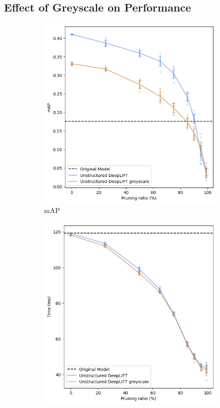 \documentclass[10pt]{cai}
\begin{document}
\subsection{Effect of Greyscale on Performance}
\label{sec3}
\begin{figure}
    \centering
    \captionsetup{justification=centering}
    \begin{subfigure}[b]{.45\textwidth}
      \centering
      \includegraphics[width=1\linewidth]{figs/mAP2.PNG}
      \caption{mAP}
      \label{fig:mAP2}
    \end{subfigure}%
    \begin{subfigure}[b]{.45\textwidth}
      \centering
      \includegraphics[width=1\linewidth]{figs/time2.PNG}

\end{subfigure}
\end{figure}
\end{document}
